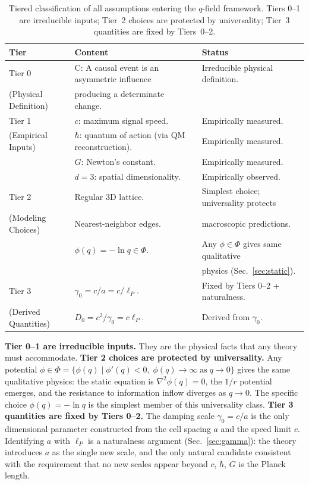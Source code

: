 \documentclass[aps,prd,twocolumn,showpacs,superscriptaddress,preprintnumbers]{revtex4-2}
\begin{document}
\begin{table}[h]
\centering
\caption{Tiered classification of all assumptions entering the $q$-field framework. Tiers 0--1 are irreducible inputs; Tier~2 choices are protected by universality; Tier~3 quantities are fixed by Tiers~0--2.}
\label{tab:tiers}
\begin{tabular}{p{}p{}p{}}
\toprule
\textbf{Tier} & \textbf{Content} & \textbf{Status} \\
\midrule
Tier 0 & C: A causal event is an asymmetric influence & Irreducible physical definition. \\
(Physical Definition) & producing a determinate change. & \\
\midrule
Tier 1 & $c$: maximum signal speed. & Empirically measured. \\
(Empirical Inputs) & $\hbar$: quantum of action (via QM reconstruction). & Empirically measured. \\
& $G$: Newton's constant. & Empirically measured. \\
& $d=3$: spatial dimensionality. & Empirically observed. \\
\midrule
Tier 2 & Regular 3D lattice. & Simplest choice; universality protects \\
(Modeling Choices) & Nearest-neighbor edges. & macroscopic predictions. \\
& $\phi(q)=-\ln q \in \Phi$. & Any $\phi\in\Phi$ gives same qualitative \\
& & physics (Sec.~\ref{sec:static}). \\
\midrule
Tier 3 & $\gamma_0 = c/a = c/\ell_P$. & Fixed by Tiers 0--2 + naturalness. \\
(Derived Quantities) & $D_0 = c^2/\gamma_0 = c\ell_P$. & Derived from $\gamma_0$. \\
\bottomrule
\end{tabular}
\end{table}

\textbf{Tier 0--1 are irreducible inputs.} They are the physical facts that any theory must accommodate.
\textbf{Tier 2 choices are protected by universality.} Any potential $\phi\in\Phi=\{\phi(q)\mid\phi'(q)<0,\;\phi(q)\to\infty\;\text{as}\;q\to0\}$ gives the same qualitative physics: the static equation is $\nabla^2\phi(q)=0$, the $1/r$ potential emerges, and the resistance to information inflow diverges as $q\to0$.
The specific choice $\phi(q)=-\ln q$ is the simplest member of this universality class.
\textbf{Tier 3 quantities are fixed by Tiers 0--2.} The damping scale $\gamma_0=c/a$ is the only dimensional parameter constructed from the cell spacing $a$ and the speed limit $c$.
Identifying $a$ with $\ell_P$ is a naturalness argument (Sec.~\ref{sec:gamma}): the theory introduces $a$ as the single new scale, and the only natural candidate consistent with the requirement that no new scales appear beyond $c$, $\hbar$, $G$ is the Planck length.
\end{document}

